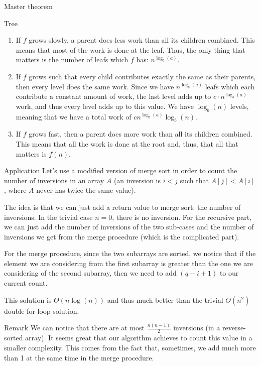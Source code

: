 \documentclass[a4paper]{article}
\begin{document}
\begin{parag}{Master theorem}
\begin{subparag}{Tree}
        \begin{enumerate}[left=0pt]
            \item If $f$ grows slowly, a parent does less work than all its children combined. This means that most of the work is done at the leaf. Thus, the only thing that matters is the number of leafs which $f$ has: $n^{\log_b\left(a\right)}$.
            \item If $f$ grows such that every child contributes exactly the same as their parents, then every level does the same work. Since we have $n^{\log_b\left(a\right)}$ leafs which each contribute a constant amount of work, the last level adds up to $c\cdot n^{\log_b\left(a\right)}$ work, and thus every level adds up to this value. We have $\log_b\left(n\right)$ levels, meaning that we have a total work of $c n^{\log_b\left(a\right)} \log_b\left(n\right)$.
            \item If $f$ grows fast, then a parent does more work than all its children combined. This means that all the work is done at the root and, thus, that all that matters is $f\left(n\right)$.
        \end{enumerate}
    \end{subparag}

\end{parag}

\begin{parag}{Application}
    Let's use a modified version of merge sort in order to count the number of inversions in an array $A$ (an inversion is $i < j$ such that $A\left[j\right] < A\left[i\right]$, where $A$ never has twice the same value).

    The idea is that we can just add a return value to merge sort: the number of inversions. In the trivial case $n = 0$, there is no inversion. For the recursive part, we can just add the number of inversions of the two sub-cases and the number of inversions we get from the merge procedure (which is the complicated part). 

    For the merge procedure, since the two subarrays are sorted, we notice that if the element we are considering from the first subarray is greater than the one we are considering of the second subarray, then we need to add $\left(q - i + 1\right)$ to our current count.

    This solution is $\Theta\left(n \log\left(n\right)\right)$ and thus much better than the trivial $\Theta\left(n^2\right)$ double for-loop solution.

    \begin{subparag}{Remark}
        We can notice that there are at most $\frac{n\left(n-1\right)}{2}$ inversions (in a reverse-sorted array). It seems great that our algorithm achieves to count this value in a smaller complexity. This comes from the fact that, sometimes, we add much more than 1 at the same time in the merge procedure.
    \end{subparag}
\end{parag}
\end{document}
